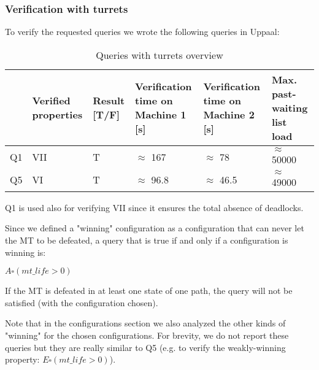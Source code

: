 \documentclass[
10pt, %
a4paper, %
oneside, %
headinclude,footinclude, %
BCOR5mm, %
]{scrartcl}
\begin{document}
			\subsubsection{Verification with turrets}
				To verify the requested queries we wrote the following queries in Uppaal:
				
				\begin{table}[H]
					\centering
					\begin{tabularx}{\textwidth}{||c|>{\raggedright\arraybackslash}X|>{\raggedright\arraybackslash}X|>{\raggedright\arraybackslash}X|>{\raggedright\arraybackslash}X|>{\raggedright\arraybackslash}X||}
						\hline
						& Verified properties & Result [T/F] & Verification time on Machine 1 [s] & Verification time on Machine 2 [s] & Max. past-waiting list load \\
						\hline
						Q1 & VII & T & $\approx$ 167 & $\approx$ 78 & $\approx$ 50000\\ \hline
						Q5 & VI & T &  $\approx$ 96.8 & $\approx$ 46.5 & $\approx$ 49000  \\
						\hline
					\end{tabularx}
					\caption{Queries with turrets overview}
				\end{table}
				
				Q1 is used also for verifying VII since it ensures the total absence of deadlocks.
				
				Since we defined a "winning" configuration as a configuration that can never let the MT to be defeated, a query that is true if and only if a configuration is winning is:
				\begin{center}
					$A\square(mt\_life>0)$	
				\end{center}
				If the MT is defeated in at least one state of one path, the query will not be satisfied (with the configuration chosen).
				
				Note that in the configurations section we also analyzed the other kinds of "winning" for the chosen configurations. For brevity, we do not report these queries but they are really similar to Q5 (e.g. to verify the weakly-winning property: $E\square(mt\_life>0)$).
\end{document}
